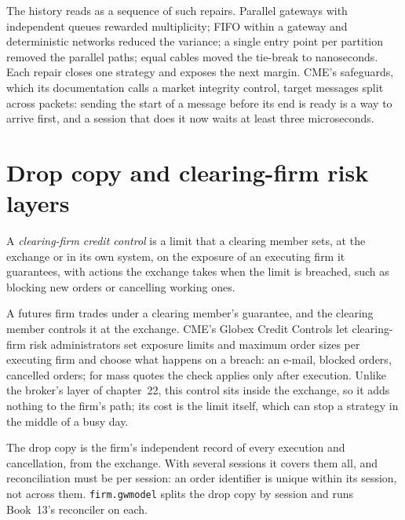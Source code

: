The history reads as a sequence of such repairs. Parallel gateways with independent queues rewarded multiplicity; FIFO within a
gateway and deterministic networks reduced the variance; a single entry point per partition removed the parallel paths; equal
cables moved the tie-break to nanoseconds. Each repair closes one strategy and exposes the next margin. CME's safeguards, which
its documentation calls a market integrity control, target messages split across packets: sending the start of a message before
its end is ready is a way to arrive first, and a session that does it now waits at least three microseconds.

\section{Drop copy and clearing-firm risk layers}

\begin{definition}\label{def:nw:futures-connectivity:credit}
A \emph{clearing-firm credit control} is a limit that a clearing member sets, at the exchange
or in its own system, on the exposure of an executing firm it guarantees, with actions the exchange takes when the limit is
breached, such as blocking new orders or cancelling working ones.
\end{definition}

A futures firm trades under a clearing member's guarantee, and the clearing member controls it at the exchange. CME's Globex
Credit Controls let clearing-firm risk administrators set exposure limits and maximum order sizes per executing firm and choose
what happens on a breach: an e-mail, blocked orders, cancelled orders; for mass quotes the check applies only after execution.
Unlike the broker's layer of chapter~22, this control sits inside the exchange, so it adds nothing to the firm's path; its cost
is the limit itself, which can stop a strategy in the middle of a busy day.

The drop copy is the firm's independent record of every execution and cancellation, from the exchange. With several sessions it
covers them all, and reconciliation must be per session: an order identifier is unique within its session, not across them.
\texttt{firm.gwmodel} splits the drop copy by session and runs Book~13's reconciler on each.

\label{lst:nw:futures-connectivity:reconcile}

